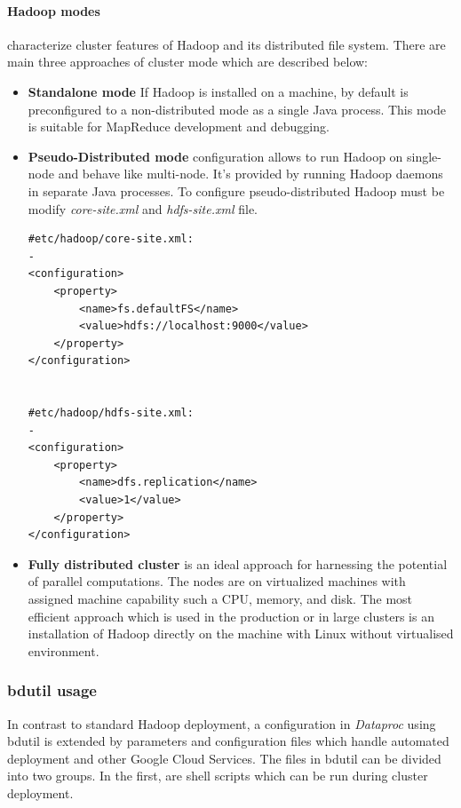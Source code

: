 \documentclass[a4paper,12pt,oneside]{report}
\begin{document}
\paragraph{Hadoop modes} characterize cluster features of Hadoop and its distributed file system. 
There are main three approaches of cluster mode which are described below:
\begin{itemize}
\item \textbf{Standalone mode} If Hadoop is installed on a machine, by default is preconfigured to a 
non-distributed mode as a single Java process. This mode  is suitable for MapReduce development and debugging.
\item \textbf{Pseudo-Distributed mode}  configuration allows to run  Hadoop on single-node and behave
 like multi-node. It's provided by running Hadoop daemons in separate Java processes. To configure pseudo-distributed Hadoop must be modify \textit{core-site.xml} and \textit{hdfs-site.xml} file\cite{hadoop_modes}.  


\begin{footnotesize}\begin{lstlisting}[style=python]
#etc/hadoop/core-site.xml:
-
<configuration>
    <property>
        <name>fs.defaultFS</name>
        <value>hdfs://localhost:9000</value>
    </property>
</configuration>


#etc/hadoop/hdfs-site.xml: 
-
<configuration>
    <property>
        <name>dfs.replication</name>
        <value>1</value>
    </property>
</configuration>
\end{lstlisting}\end{footnotesize}

\item \textbf{Fully distributed cluster} is an ideal approach for harnessing the potential of
 parallel computations. The nodes are on virtualized machines with assigned machine capability 
 such a CPU, memory, and disk. The most efficient approach which is used in the production or 
 in large clusters is an installation of Hadoop directly on the machine with Linux without virtualised environment.

\end{itemize}


\subsubsection{bdutil usage}
In contrast to standard Hadoop deployment, a configuration in \textit{Dataproc} using bdutil is 
extended by parameters and configuration files which handle automated deployment and other Google
Cloud Services. The files in bdutil can be divided into two groups. In the first,  are shell scripts 
which can be run during cluster deployment.
\end{document}
